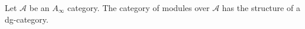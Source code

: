 
 
 Let $\mathcal A$ be an $A_\infty$ category. The category of modules over $\mathcal A$ has the structure of a dg-category.

 